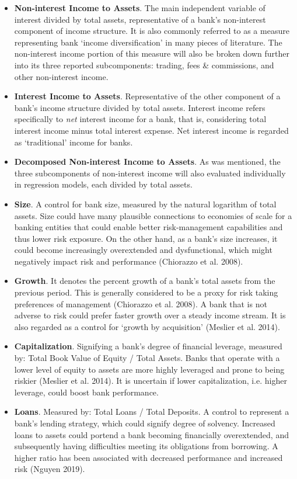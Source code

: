\documentclass[10pt]{article} %
\begin{document}
\begin{itemize}[label=$-$]
    \item \textbf{Non-interest Income to Assets}. The main independent variable of interest divided by total assets, representative of a bank's non-interest component of income structure. It is also commonly referred to as a measure representing bank `income diversification' in many pieces of literature. The non-interest income portion of this measure will also be broken down further into its three reported subcomponents: trading, fees \& commissions, and other non-interest income.
    \item \textbf{Interest Income to Assets}. Representative of the other component of a bank's income structure divided by total assets. Interest income refers specifically to \textit{net} interest income for a bank, that is, considering total interest income minus total interest expense. Net interest income is regarded as `traditional' income for banks.
    \item \textbf{Decomposed Non-interest Income to Assets}. As was mentioned, the three subcomponents of non-interest income will also evaluated individually in regression models, each divided by total assets.  
    \item \textbf{Size}. A control for bank size, measured by the natural logarithm of total assets. Size could have many plausible connections to economies of scale for a banking entities that could enable better risk-management capabilities and thus lower risk exposure. On the other hand, as a bank's size increases, it could become increasingly overextended and dysfunctional, which might negatively impact risk and performance (Chiorazzo et al. 2008).
    \item \textbf{Growth}. It denotes the percent growth of a bank's total assets from the previous period. This is generally considered to be a proxy for risk taking preferences of management (Chiorazzo et al. 2008). A bank that is not adverse to risk could prefer faster growth over a steady income stream. It is also regarded as a control for `growth by acquisition' (Meslier et al. 2014).
    \item \textbf{Capitalization}. Signifying a bank's degree of financial leverage, measured by: Total Book Value of Equity / Total Assets. Banks that operate with a lower level of equity to assets are more highly leveraged and prone to being riskier (Meslier et al. 2014). It is uncertain if lower capitalization, i.e. higher leverage, could boost bank performance.
    \item \textbf{Loans}. Measured by: Total Loans / Total Deposits. A control to represent  a bank's lending strategy, which could signify degree of solvency. Increased loans to assets could portend a bank becoming financially overextended, and subsequently having difficulties meeting its obligations from borrowing. A higher ratio has been associated with decreased performance and increased risk (Nguyen 2019).  

\end{itemize}
\end{document}
